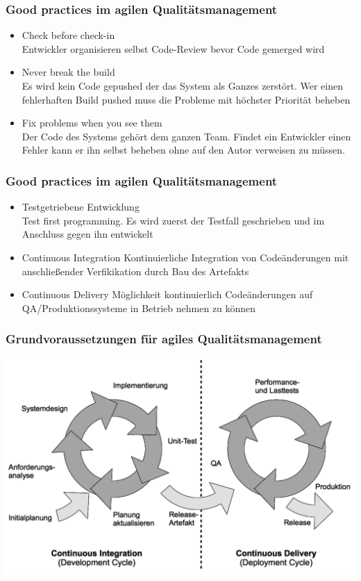 \begin{frame}
\frametitle{Good practices im agilen Qualitätsmanagement}
	\begin{itemize}
		\item Check before check-in \\
				  Entwickler organisieren selbst Code-Review bevor Code gemerged wird
		\item Never break the build \\
		 			Es wird kein Code gepushed der das System als Ganzes zerstört. Wer einen
					fehlerhaften Build pushed muss die Probleme mit höchster Priorität beheben
		\item Fix problems when you see them \\
		 			Der Code des Systems gehört dem ganzen Team. Findet ein Entwickler einen Fehler
					kann er ihn selbst beheben ohne auf den Autor verweisen zu müssen.
	\end{itemize}
\end{frame}

\begin{frame}
\frametitle{Good practices im agilen Qualitätsmanagement}
	\begin{itemize}
		\item Testgetriebene Entwicklung \\
					Test first programming. Es wird zuerst der Testfall geschrieben und im Anschluss
					gegen ihn entwickelt
		\item Continuous Integration
					Kontinuierliche Integration von Codeänderungen mit anschließender Verfikikation
					durch Bau des Artefakts
		\item Continuous Delivery
					Möglichkeit kontinuierlich Codeänderungen auf QA/Produktionssysteme in Betrieb
					nehmen zu können
	\end{itemize}
\end{frame}

\begin{frame}
\frametitle{Grundvoraussetzungen für agiles Qualitätsmanagement}
	\center\includegraphics[width=1\textwidth,
		keepaspectratio=true]{bilder/continuous_delivery.png}
\end{frame}

